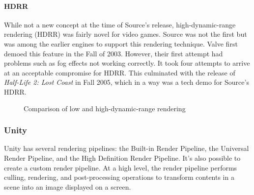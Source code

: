 \documentclass[a4paper, 12pt]{scrartcl}
\begin{document}
\paragraph{HDRR}
While not a new concept at the time of Source's release, high-dynamic-range rendering (HDRR) was fairly novel for video games. Source was not the first but was among the earlier engines to support this rendering technique. Valve first demoed this feature in the Fall of 2003. However, their first attempt had problems such as fog effects not working correctly. It took four attempts to arrive at an acceptable compromise for HDRR. This culminated with the release of \textit{Half-Life 2: Lost Coast} in Fall 2005, which in a way was a tech demo for Source's HDRR.

\begin{figure}[!htb]
  \centering
  \qquad
  \caption{Comparison of low and high-dynamic-range rendering}
  \label{fig:source_hdrr}
\end{figure}

\subsubsection{Unity}
Unity has several rendering pipelines: the Built-in Render Pipeline, the Universal Render Pipeline, and the High Definition Render Pipeline. It's also possible to create a custom render pipeline. At a high level, the render pipeline performs culling, rendering, and post-processing operations to transform contents in a scene into an image displayed on a screen.
\end{document}
